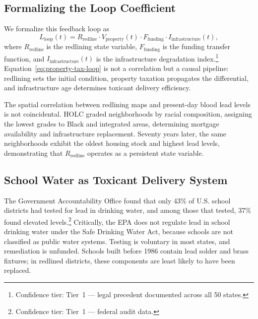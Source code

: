 \subsection{Formalizing the Loop Coefficient}

We formalize this feedback loop as
\begin{equation}
L_{\text{loop}}(t) = R_{\text{redline}} \cdot V_{\text{property}}(t) \cdot F_{\text{funding}} \cdot I_{\text{infrastructure}}(t),
\label{eq:property-tax-loop}
\end{equation}
where $R_{\text{redline}}$ is the redlining state variable, $F_{\text{funding}}$
is the funding transfer function, and $I_{\text{infrastructure}}(t)$ is the
infrastructure degradation index.\footnote{Confidence tier: Tier~1 --- legal
precedent documented across all 50 states.}
Equation~\eqref{eq:property-tax-loop} is not a correlation but a causal pipeline:
redlining sets the initial condition, property taxation propagates the
differential, and infrastructure age determines toxicant delivery efficiency.

The spatial correlation between redlining maps and present-day blood lead
levels is not coincidental. HOLC graded neighborhoods by racial composition,
assigning the lowest grades to Black and integrated areas, determining mortgage
availability and infrastructure replacement. Seventy years later, the same
neighborhoods exhibit the oldest housing stock and highest lead levels,
demonstrating that $R_{\text{redline}}$ operates as a persistent state variable.

\subsection{School Water as Toxicant Delivery System}

The Government Accountability Office found that only 43\% of U.S. school
districts had tested for lead in drinking water, and among those that tested,
37\% found elevated levels.\footnote{Confidence tier: Tier~1 ---
federal audit data.} Critically, the EPA does not regulate lead in school
drinking water under the Safe Drinking Water Act, because schools are not
classified as public water systems. Testing is voluntary in most states, and
remediation is unfunded. Schools built before 1986 contain lead solder and
brass fixtures; in redlined districts, these components are least likely to have
been replaced.

